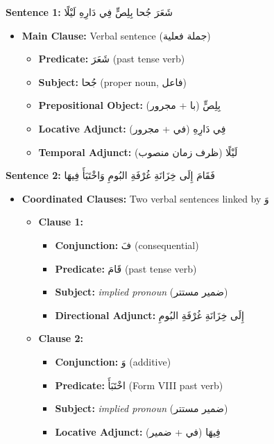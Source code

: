 \documentclass[letterpaper,12pt]{article}
\begin{document}
\begin{tcolorbox}[colback=boxcolor,colframe=headercolor,title=\textbf{Syntactic Tree Structure},breakable]
\textbf{Sentence 1:} \textarabic{شَعَرَ جُحا بِلِصٍّ فِي دَارِهِ لَيْلًا}

\begin{itemize}
\item \textbf{Main Clause:} Verbal sentence (\textarabic{جملة فعلية})
  \begin{itemize}
  \item \textbf{Predicate:} \textarabic{شَعَرَ} (past tense verb)
  \item \textbf{Subject:} \textarabic{جُحا} (proper noun, \textarabic{فاعل})
  \item \textbf{Prepositional Object:} \textarabic{بِلِصٍّ} (\textarabic{با + مجرور})
  \item \textbf{Locative Adjunct:} \textarabic{فِي دَارِهِ} (\textarabic{في + مجرور})
  \item \textbf{Temporal Adjunct:} \textarabic{لَيْلًا} (\textarabic{ظرف زمان منصوب})
  \end{itemize}
\end{itemize}

\textbf{Sentence 2:} \textarabic{فَقَامَ إِلَى خِزَانَةِ غُرْفَةِ البُومِ وَاخْتَبَأَ فِيهَا}

\begin{itemize}
\item \textbf{Coordinated Clauses:} Two verbal sentences linked by \textarabic{وَ}
  \begin{itemize}
  \item \textbf{Clause 1:}
    \begin{itemize}
    \item \textbf{Conjunction:} \textarabic{فَ} (consequential)
    \item \textbf{Predicate:} \textarabic{قَامَ} (past tense verb)
    \item \textbf{Subject:} \textit{implied pronoun} (\textarabic{ضمير مستتر})
    \item \textbf{Directional Adjunct:} \textarabic{إِلَى خِزَانَةِ غُرْفَةِ البُومِ}
    \end{itemize}
  \item \textbf{Clause 2:}
    \begin{itemize}
    \item \textbf{Conjunction:} \textarabic{وَ} (additive)
    \item \textbf{Predicate:} \textarabic{اخْتَبَأَ} (Form VIII past verb)
    \item \textbf{Subject:} \textit{implied pronoun} (\textarabic{ضمير مستتر})
    \item \textbf{Locative Adjunct:} \textarabic{فِيهَا} (\textarabic{في + ضمير})
    \end{itemize}
  \end{itemize}
\end{itemize}
\end{tcolorbox}
\end{document}
